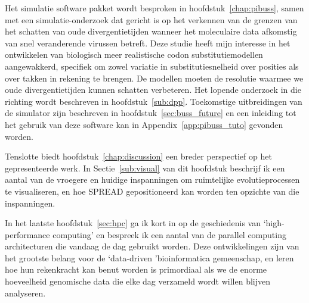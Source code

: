 {Het simulatie software pakket {\bussname} wordt besproken in hoofdstuk~\ref{chap:pibuss}, samen met een simulatie-onderzoek dat gericht is op het verkennen van de grenzen van het schatten van oude divergentietijden wanneer het moleculaire data afkomstig van snel veranderende virussen betreft.
Deze studie heeft mijn interesse in het ontwikkelen van biologisch meer realistische codon substitutiemodellen aangewakkerd, specifiek om zowel variatie in substitutiesnelheid over posities als over takken in rekening te brengen.
De modellen moeten de resolutie waarmee we oude divergentietijden kunnen schatten verbeteren. %
Het lopende onderzoek in die richting wordt beschreven in hoofdstuk~\ref{sub:dpp}.
Toekomstige uitbreidingen van de {\bussname} simulator zijn beschreven in hoofdstuk~\ref{sec:buss_future} en een inleiding tot het gebruik van deze software kan in Appendix~\ref{app:pibuss_tuto} gevonden worden.

Tenslotte biedt hoofdstuk~\ref{chap:discussion} een breder perspectief op het gepresenteerde werk.
In Sectie~\ref{sub:visual} van dit hoofdstuk beschrijf ik een aantal van de vroegere en huidige inspanningen om ruimtelijke evolutieprocessen te visualiseren, en hoe SPREAD gepositioneerd kan worden ten opzichte van die inspanningen.

In het laatste hoofdstuk~\ref{sec:hpc} ga ik kort in op de geschiedenis van `high-performance computing' en bespreek ik een aantal van de parallel computing architecturen die vandaag de dag gebruikt worden.
Deze ontwikkelingen zijn van het grootste belang voor de `data-driven 'bioinformatica gemeenschap, en leren hoe hun rekenkracht kan benut worden is primordiaal als we de enorme hoeveelheid genomische data die elke dag verzameld wordt willen blijven analyseren.

}
